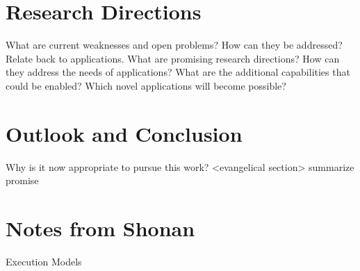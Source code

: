 \begin{bibunit}
\section{Research Directions}
\begin{note}
What are current weaknesses and open problems? How can they be addressed? Relate back to applications.
What are promising research directions? How can they address the needs of applications?
What are the additional capabilities that could be enabled? Which novel applications will become possible?
\end{note}
  
\section{Outlook and Conclusion}
\begin{note}
[up to 3 pages]
Why is it now appropriate to pursue this work?
<evangelical section>
summarize promise
\end{note}

\section*{Notes from Shonan}
\begin{noteco}
  Execution Models


\end{noteco}
\end{bibunit}
